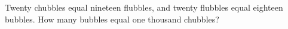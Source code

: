 Twenty chubbles equal nineteen flubbles, and twenty flubbles equal eighteen bubbles. How many bubbles equal one thousand chubbles?
